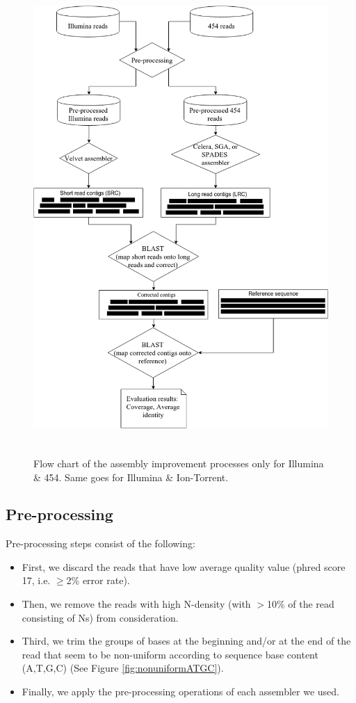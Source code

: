 \documentclass{llncs}
\begin{document}
\begin{figure}[htbp]
\centerline{\includegraphics[width=12cm, height=18cm]{flowChart.png}}
\caption{Flow chart of the assembly improvement processes only for Illumina \& 454. Same goes for Illumina \& Ion-Torrent.}
\label{fig:flowChart}
\end{figure}



\subsection{Pre-processing} 
Pre-processing steps consist of the following: 
\begin{itemize}
\item First, we discard the reads that have low average quality value (phred score 17, i.e. $\geq$2\% error rate). 
\item Then, we remove the reads with high N-density (with $>$10\% of the read consisting of Ns) from consideration.
\item Third, we trim the groups of bases at the beginning and/or at the end of the read that seem to be non-uniform according to sequence base content (A,T,G,C) (See Figure \ref{fig:nonuniformATGC}). 
\item Finally, we apply the pre-processing operations of each assembler we used.
\end{itemize}
\end{document}
